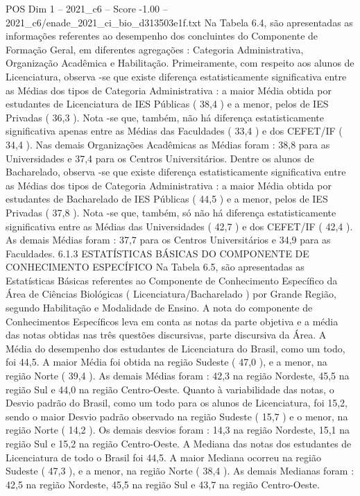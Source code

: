 \begin{textsample}{POS Dim 1 – 2021\_c6 – Score -1.00 – 2021\_c6/enade\_2021\_ci\_bio\_d313503e1f.txt}
Na Tabela 6.4, são apresentadas as informações referentes ao desempenho dos concluintes do Componente de Formação Geral, em diferentes agregações : Categoria Administrativa, Organização Acadêmica e Habilitação.
Primeiramente, com respeito aos alunos de Licenciatura, observa -se que existe diferença estatisticamente significativa entre as Médias dos tipos de Categoria Administrativa : a maior Média obtida por estudantes de Licenciatura de IES Públicas ( 38,4 ) e a menor, pelos de IES Privadas ( 36,3 ).
Nota -se que, também, não há diferença estatisticamente significativa apenas entre as Médias das Faculdades ( 33,4 ) e dos CEFET/IF ( 34,4 ).
Nas demais Organizações Acadêmicas as Médias foram : 38,8 para as Universidades e 37,4 para os Centros Universitários.
Dentre os alunos de Bacharelado, observa -se que existe diferença estatisticamente significativa entre as Médias dos tipos de Categoria Administrativa : a maior Média obtida por estudantes de Bacharelado de IES Públicas ( 44,5 ) e a menor, pelos de IES Privadas ( 37,8 ).
Nota -se que, também, só não há diferença estatisticamente significativa entre as Médias das Universidades ( 42,7 ) e dos CEFET/IF ( 42,4 ).
As demais Médias foram : 37,7 para os Centros Universitários e 34,9 para as Faculdades. 6.1.3 ESTATÍSTICAS BÁSICAS DO COMPONENTE DE CONHECIMENTO ESPECÍFICO Na Tabela 6.5, são apresentadas as Estatísticas Básicas referentes ao Componente de Conhecimento Específico da Área de Ciências Biológicas ( Licenciatura/Bacharelado ) por Grande Região, segundo Habilitação e Modalidade de Ensino.
A nota do componente de Conhecimentos Específicos leva em conta as notas da parte objetiva e a média das notas obtidas nas três questões discursivas, parte discursiva da Área.
A Média do desempenho dos estudantes de Licenciatura do Brasil, como um todo, foi 44,5.
A maior Média foi obtida na região Sudeste ( 47,0 ), e a menor, na região Norte ( 39,4 ).
As demais Médias foram : 42,3 na região Nordeste, 45,5 na região Sul e 44,0 na região Centro-Oeste.
Quanto à variabilidade das notas, o Desvio padrão do Brasil, como um todo para os alunos de Licenciatura, foi 15,2, sendo o maior Desvio padrão observado na região Sudeste ( 15,7 ) e o menor, na região Norte ( 14,2 ).
Os demais desvios foram : 14,3 na região Nordeste, 15,1 na região Sul e 15,2 na região Centro-Oeste.
A Mediana das notas dos estudantes de Licenciatura de todo o Brasil foi 44,5.
A maior Mediana ocorreu na região Sudeste ( 47,3 ), e a menor, na região Norte ( 38,4 ).
As demais Medianas foram : 42,5 na região Nordeste, 45,5 na região Sul e 43,7 na região Centro-Oeste.

\end{textsample}
